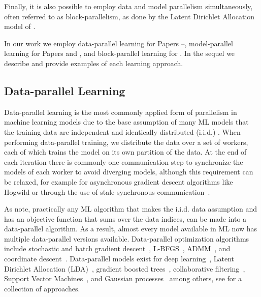 Finally, it is also possible to employ data and model parallelism simultaneously,
often referred to as block-parallelism, as done by the Latent Dirichlet Allocation
model of \cite{petuum}.

In our work we employ data-parallel learning for Papers \conceptsicdmNum--\sessionlengthNum,
model-parallel learning for Papers \boostvhtNum and \uncertaintreesNum, and
block-parallel learning for \blockgbt. In the sequel we describe and provide
examples of each learning approach.

\subsection*{Data-parallel Learning}
\label{sec:bg-data-parallel}

Data-parallel learning is the most commonly applied form of parallelism
in machine learning models due to the base assumption of many ML models
that the training data are independent and identically distributed (i.i.d.)
\cite{distributed-ml-design}. When performing data-parallel training, we
distribute the data over a set of workers, each of which trains the model
on its own partition of the data. At the end of each iteration there is commonly one communication step
to synchronize the models of each worker to avoid diverging models, although
this requirement can be relaxed, for example for asynchronous gradient descent
algorithms like Hogwild \cite{hogwild} or through the use of stale-synchronous
communication~\cite{stale-sync-ps}.

As \citet{distributed-ml-design} note, practically any ML algorithm that makes
the i.i.d. data assumption and has an objective function that sums over
the data indices, can be made into a data-parallel algorithm. As a result,
almost every model available in ML now has multiple data-parallel versions
available. Data-parallel optimization algorithms include stochastic and batch gradient
descent~\cite{dekel-optimal-distributed, parallel-sgd}, L-BFGS~\cite{lbfgs-large-scale, vw},
ADMM~\cite{admm, admm-async}, and coordinate descent~\cite{rendle-distributed-cd, parallel-cd}.
Data-parallel models exist for deep learning~\cite{large-scale-dl}, Latent Dirichlet Allocation (LDA)~\cite{parallel-lda},
gradient boosted trees~\cite{xgboost, lightgbm}, collaborative filtering~\cite{koren-cf, parallel-cf}, Support Vector Machines~\cite{parallel-svm, psvm, parallel-svm-survey}, and Gaussian processes~\cite{gp-big-data, gp-distributed} among others,
see \cite{parallel-ml-book} for a collection of approaches.

